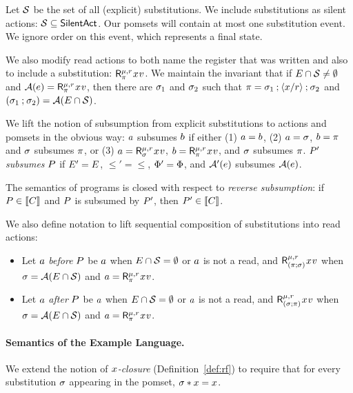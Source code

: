 Let $\mathcal{S}$ be the set of all (explicit) substitutions.  We include
substitutions as silent actions: $\mathcal{S}\subseteq\mathsf{SilentAct}$.
Our pomsets will contain at most one substitution event.  We ignore order on
this event, which represents a final state.

We also modify read actions to both name the register that was written
and also to include a substitution:
$\DRreg[\amode]{\aReg}{\bSub}{\aLoc}{\aVal}$.
We maintain the invariant that if
$E\cap\mathcal{S}\neq\emptyset$ and 
$\labelingAct(\aEv)=\DRreg[\amode]{\aReg}{\bSub}{\aLoc}{\aVal}$, 
then
there are $\sigma_1$ and $\sigma_2$ such that $\pi=\sigma_1\mathbin{;}\langle x/r\rangle\mathbin{;}\sigma_2$ and
$(\sigma_1\mathbin{;}\sigma_2) = \mathcal{A}(E\cap\mathcal{S})$.

We lift the notion of subsumption from explicit substitutions to actions and
pomsets in the obvious way: $a$ subsumes $b$ if either (1)
$a=b$, (2) $a=\sigma$, $b=\pi$ and $\sigma$ subsumes $\pi$,
or (3) $\aAct=\DRreg[\amode]{\aReg}{\aSub}{\aLoc}{\aVal}$,
$\bAct=\DRreg[\amode]{\aReg}{\bSub}{\aLoc}{\aVal}$, and $\sigma$ subsumes
$\pi$.
$P'$ \emph{subsumes} $P$ if $E'=E$, ${\le'}={\le}$,
$\Phi'=\Phi$, and $\mathcal{A}'(e)$
subsumes $\mathcal{A}(e)$. 

The semantics of programs is closed with respect to \emph{reverse
  subsumption}:  if $P\in\llbracket C\rrbracket$ and $P$ is subsumed by $P'$,
then $P'\in\llbracket C\rrbracket$.


We also define notation to lift sequential composition of substitutions into
read actions:
\begin{itemize}
\item Let $a$ \emph{before} $P$ be $a$ when
  $E\cap\mathcal{S}=\emptyset$ or $a$ is not a read, and
  $\DRreg[\amode]{\aReg}{(\bSub\SUBSEQ\aSub)}{\aLoc}{\aVal}$ when
  $\sigma=\mathcal{A}(E\cap\mathcal{S})$ and
  $\aAct=\DRreg[\amode]{\aReg}{\bSub}{\aLoc}{\aVal}$.
\item 
  Let $a$ \emph{after} $P$ be $a$ when $E\cap\mathcal{S}=\emptyset$
  or $a$ is not a read, and
  $\DRreg[\amode]{\aReg}{(\aSub\SUBSEQ\bSub)}{\aLoc}{\aVal}$ when
  $\sigma=\mathcal{A}(E\cap\mathcal{S})$ and
  $\aAct=\DRreg[\amode]{\aReg}{\bSub}{\aLoc}{\aVal}$.
\end{itemize}
\paragraph{Semantics of the Example Language.}
We extend the notion of \emph{$x$-closure} (Definition~\ref{def:rf}) to
require that for every substitution $\sigma$ appearing in the pomset,
$\sigma\mathbin{\ast}x=x$.


